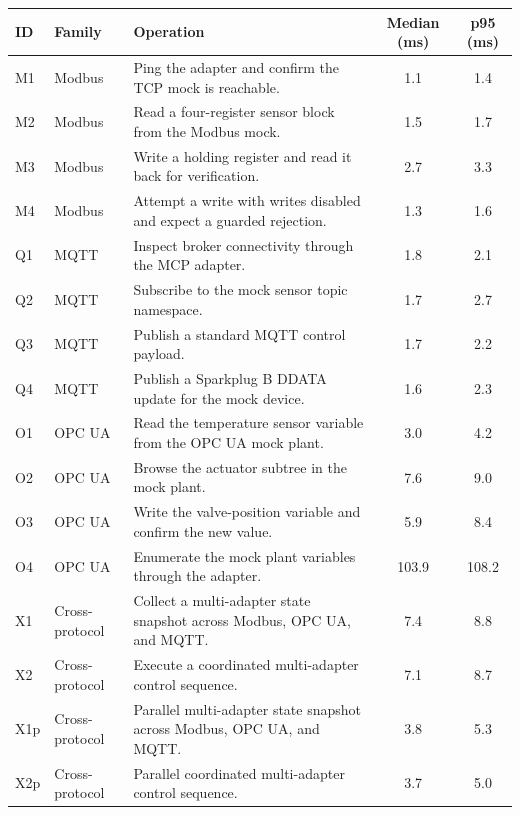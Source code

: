     \begin{tabularx}{\textwidth}{@{}llYcc@{}}
        \toprule
        ID & Family & Operation & Median (ms) & p95 (ms) \\
        \midrule
        M1 & Modbus & Ping the adapter and confirm the TCP mock is reachable. & 1.1 & 1.4 \\
        M2 & Modbus & Read a four-register sensor block from the Modbus mock. & 1.5 & 1.7 \\
        M3 & Modbus & Write a holding register and read it back for verification. & 2.7 & 3.3 \\
        M4 & Modbus & Attempt a write with writes disabled and expect a guarded rejection. & 1.3 & 1.6 \\
        \midrule
        Q1 & MQTT & Inspect broker connectivity through the MCP adapter. & 1.8 & 2.1 \\
        Q2 & MQTT & Subscribe to the mock sensor topic namespace. & 1.7 & 2.7 \\
        Q3 & MQTT & Publish a standard MQTT control payload. & 1.7 & 2.2 \\
        Q4 & MQTT & Publish a Sparkplug B DDATA update for the mock device. & 1.6 & 2.3 \\
        \midrule
        O1 & OPC UA & Read the temperature sensor variable from the OPC UA mock plant. & 3.0 & 4.2 \\
        O2 & OPC UA & Browse the actuator subtree in the mock plant. & 7.6 & 9.0 \\
        O3 & OPC UA & Write the valve-position variable and confirm the new value. & 5.9 & 8.4 \\
        O4 & OPC UA & Enumerate the mock plant variables through the adapter. & 103.9 & 108.2 \\
        \midrule
        X1 & Cross-protocol & Collect a multi-adapter state snapshot across Modbus, OPC UA, and MQTT. & 7.4 & 8.8 \\
        X2 & Cross-protocol & Execute a coordinated multi-adapter control sequence. & 7.1 & 8.7 \\
        X1p & Cross-protocol & Parallel multi-adapter state snapshot across Modbus, OPC UA, and MQTT. & 3.8 & 5.3 \\
        X2p & Cross-protocol & Parallel coordinated multi-adapter control sequence. & 3.7 & 5.0 \\
        \bottomrule
    \end{tabularx}
